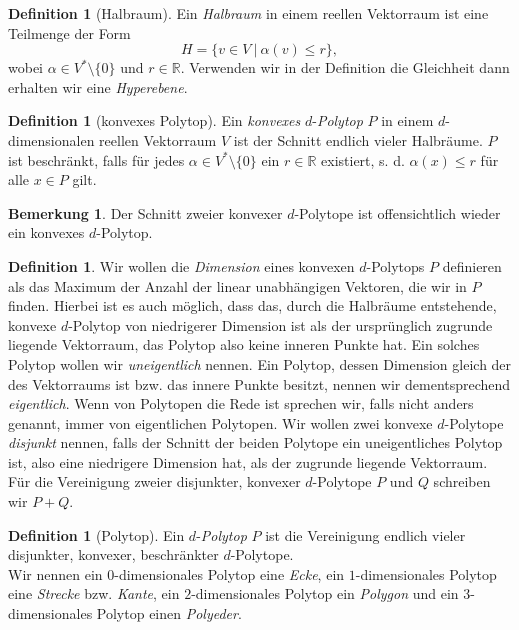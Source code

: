 \documentclass[11pt,titlepage]{article}
\newcommand{\setR}{\mathbb{R}}
\theoremstyle{definition}
\newtheorem{definition}[theorem]{Definition}
\newtheorem{remark}[theorem]{Bemerkung}
\theoremstyle{remark}
\begin{document}
	\begin{definition}[Halbraum]
		Ein \textsl{Halbraum} in einem reellen Vektorraum ist eine Teilmenge 
		der Form
		\[ H= \{ v\in V \  \vert\  \alpha(v)\leq r \}, \]
		wobei $\alpha\in V^*\setminus\{0\}$ und $r\in\setR$. Verwenden 
		wir in der Definition die Gleichheit dann erhalten wir eine
		\textsl{Hyperebene}.
	\end{definition}
	
	\begin{definition}[konvexes Polytop]
		Ein \textsl{konvexes} $d$-\textsl{Polytop} $P$ in einem $d$-dimensionalen reellen Vektorraum $V$ ist der Schnitt endlich vieler 
		Halbräume. $P$ ist beschränkt, falls für jedes $\alpha\in V^*\setminus\{0\}$ ein $r\in \setR$ existiert, s. d. 
		$\alpha(x)\leq r$ für alle $x\in P$ gilt.
	\end{definition}
	
	\begin{remark}
		Der Schnitt zweier konvexer $d$-Polytope ist offensichtlich wieder ein konvexes $d$-Polytop. 
	\end{remark}

	\begin{definition}
		Wir wollen die \textsl{Dimension} eines konvexen $d$-Polytops $P$ 
		definieren als das 
		Maximum der Anzahl der linear unabhängigen Vektoren, die wir in $P$ finden. 
		Hierbei ist es auch möglich, dass das, durch die Halbräume entstehende, 
		konvexe $d$-Polytop von niedrigerer Dimension ist als der ursprünglich 
		zugrunde liegende Vektorraum, das Polytop also keine inneren Punkte hat. 
		Ein solches Polytop wollen wir \textsl{uneigentlich} nennen. 
		Ein Polytop, dessen 
		Dimension gleich der des Vektorraums ist bzw. das innere Punkte besitzt, 
		nennen wir dementsprechend \textsl{eigentlich}. 
		Wenn von Polytopen die Rede ist 
		sprechen wir, falls nicht anders genannt, immer von eigentlichen Polytopen.
		Wir wollen zwei konvexe $d$-Polytope \textsl{disjunkt} nennen, 
		falls der Schnitt der 
		beiden Polytope ein uneigentliches Polytop ist, also eine niedrigere 
		Dimension hat, als der zugrunde liegende Vektorraum. Für die Vereinigung 
		zweier disjunkter, konvexer $d$-Polytope $P$ und $Q$ schreiben wir $P+Q$.
	\end{definition}
	
	\begin{definition}[Polytop]
		Ein $d$-\textsl{Polytop} $P$ ist die Vereinigung endlich vieler 
		disjunkter, konvexer, beschränkter $d$-Polytope. \\
		Wir nennen ein $0$-dimensionales Polytop eine \textsl{Ecke}, ein 
		$1$-dimensionales Polytop eine \textsl{Strecke} bzw. \textsl{Kante}, ein 
		$2$-dimensionales Polytop ein \textsl{Polygon} und ein 
		$3$-dimensionales Polytop einen \textsl{Polyeder}.
	\end{definition}
	
\end{document}
